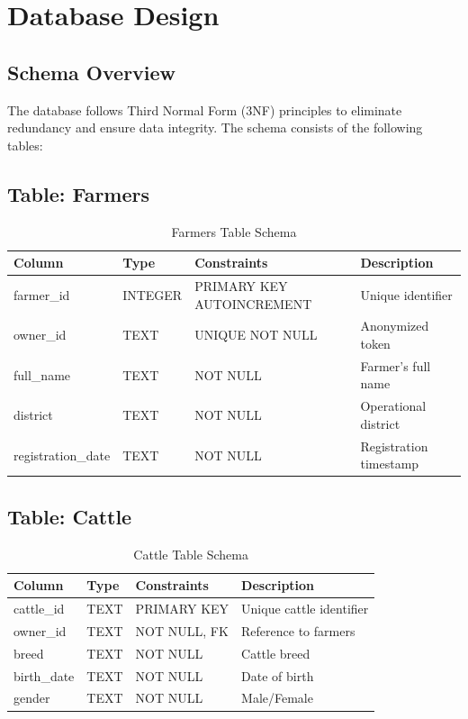 \section{Database Design}

\subsection{Schema Overview}

The database follows Third Normal Form (3NF) principles to eliminate redundancy and ensure data integrity. The schema consists of the following tables:

\subsection{Table: Farmers}

\begin{table}[H]
\centering
\begin{tabular}{|l|l|l|l|}
\hline
\textbf{Column} & \textbf{Type} & \textbf{Constraints} & \textbf{Description} \\
\hline
farmer\_id & INTEGER & PRIMARY KEY AUTOINCREMENT & Unique identifier \\
owner\_id & TEXT & UNIQUE NOT NULL & Anonymized token \\
full\_name & TEXT & NOT NULL & Farmer's full name \\
district & TEXT & NOT NULL & Operational district \\
registration\_date & TEXT & NOT NULL & Registration timestamp \\
\hline
\end{tabular}
\caption{Farmers Table Schema}
\end{table}

\subsection{Table: Cattle}

\begin{table}[H]
\centering
\begin{tabular}{|l|l|l|l|}
\hline
\textbf{Column} & \textbf{Type} & \textbf{Constraints} & \textbf{Description} \\
\hline
cattle\_id & TEXT & PRIMARY KEY & Unique cattle identifier \\
owner\_id & TEXT & NOT NULL, FK & Reference to farmers \\
breed & TEXT & NOT NULL & Cattle breed \\
birth\_date & TEXT & NOT NULL & Date of birth \\
gender & TEXT & NOT NULL & Male/Female \\
\hline
\end{tabular}
\caption{Cattle Table Schema}
\end{table}

